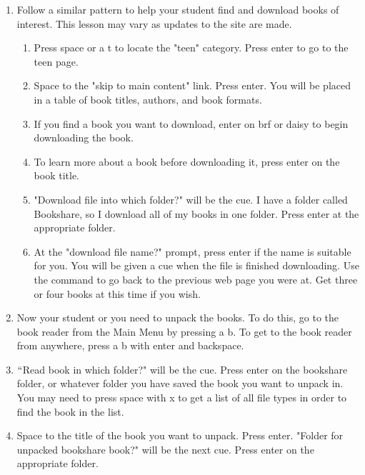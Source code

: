 \documentclass[10pt,letterpaper,twoside]{report}
\begin{document}
{{{{\begin{enumerate}
	\item Follow a similar pattern to help your student find and download books of interest. This lesson may vary as updates to the site are made.
	      
	      \begin{enumerate}
		      \item Press space or a t to locate the "teen" category.  Press enter to go to the teen page.
		            
		      \item Space to the "skip to main content" link. Press enter. You will be placed in a table of book titles, authors, and book formats.
		            
		      \item If you find a book you want to download, enter on brf or daisy to begin downloading the book.
		            
		      \item To learn more about a book before downloading it, press enter on the book title.
		            
		      \item "Download file into which folder?" will be the cue.  I have a folder called Bookshare, so I download all of my books in one folder.  Press enter at the appropriate folder.
		            
		      \item At the "download file name?" prompt, press enter if the name is suitable for you.  You will be given a cue when the file is finished downloading.  Use the command to go back to the previous web page you were at. Get three or four books at this time if you wish.
		            
		            
	      \end{enumerate}
	\item Now your student or you need to unpack the books.  To do this, go to the book reader from the Main Menu by pressing a b.  To get to the book reader from anywhere, press a b with enter and backspace.
	      
	\item $``$Read book in which folder?" will be the cue.  Press enter on the bookshare folder, or whatever folder you have saved the book you want to unpack in. You may need to press space with x to get a list of all file types in order to find the book in the list.
	      
	\item Space to the title of the book you want to unpack.  Press enter. "Folder for unpacked bookshare book?" will be the next cue.  Press enter on the appropriate folder.
	      

\end{enumerate}}}}}
\end{document}
